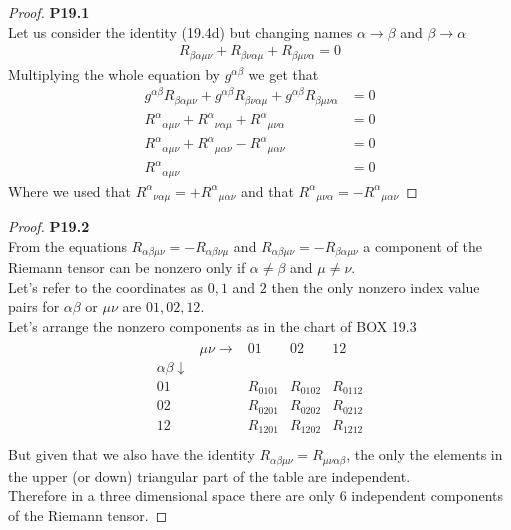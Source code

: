 \documentclass[11pt]{article}
\theoremstyle{definition}
\begin{document}
\cleardoublepage
\begin{proof}{\textbf{P19.1}}\\
Let us consider the identity (19.4d) but changing names $\alpha\to\beta$ and
$\beta\to\alpha$
\begin{align*}
    R_{\beta\alpha\mu\nu} + R_{\beta\nu\alpha\mu}
    + R_{\beta\mu\nu\alpha} = 0
\end{align*}
Multiplying the whole equation by $g^{\alpha\beta}$ we get that
\begin{align*}
    g^{\alpha\beta}R_{\beta\alpha\mu\nu} + g^{\alpha\beta}R_{\beta\nu\alpha\mu}
    + g^{\alpha\beta}R_{\beta\mu\nu\alpha} &= 0\\
    {R^\alpha}_{\alpha\mu\nu} + {R^{\alpha}}_{\nu\alpha\mu}
    + {R^\alpha}_{\mu\nu\alpha} &= 0\\
    {R^\alpha}_{\alpha\mu\nu} + {R^{\alpha}}_{\mu\alpha\nu}
    - {R^\alpha}_{\mu\alpha\nu} &= 0\\
    {R^\alpha}_{\alpha\mu\nu} &= 0
\end{align*}
Where we used that ${R^{\alpha}}_{\nu\alpha\mu} = +{R^{\alpha}}_{\mu\alpha\nu}$
and that ${R^\alpha}_{\mu\nu\alpha} = -{R^\alpha}_{\mu\alpha\nu}$
\end{proof}

\cleardoublepage
\begin{proof}{\textbf{P19.2}}\\
From the equations $R_{\alpha\beta\mu\nu} = -R_{\alpha\beta\nu\mu}$
and $R_{\alpha\beta\mu\nu} = -R_{\beta\alpha\mu\nu}$ a component of the 
Riemann tensor can be nonzero only if $\alpha \neq \beta$ and $\mu\neq\nu$.
\\
Let's refer to the coordinates as $0, 1$ and $2$ then the only nonzero index
value pairs for $\alpha\beta$ or $\mu\nu$ are $01, 02, 12$.
\\
Let's arrange the nonzero components as in the chart of BOX 19.3
\begin{align*}
    \begin{matrix}
                          &\mu\nu\to & 01       & 02       & 12       \\
    \alpha\beta\downarrow &          &          &          &          \\[7pt]
                       01 &          & R_{0101} & R_{0102} & R_{0112} \\
                       02 &          & R_{0201} & R_{0202} & R_{0212} \\
                       12 &          & R_{1201} & R_{1202} & R_{1212} \\
    \end{matrix}
\end{align*}
But given that we also have the identity
$R_{\alpha\beta\mu\nu} = R_{\mu\nu\alpha\beta}$, the only the elements in the
upper (or down) triangular part of the table are independent.
\\
Therefore in a three dimensional space there are only 6 independent components
of the Riemann tensor.
\end{proof}
\end{document}
